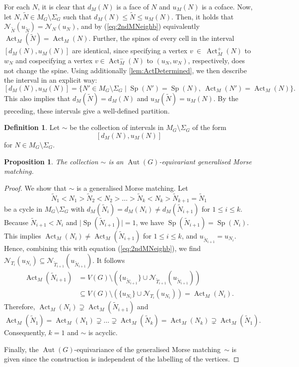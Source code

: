 \documentclass[reqno,dvipsnames]{amsart}
\theoremstyle{plain}
\newtheorem{proposition}[theorem]{Proposition}
\numberwithin{equation}{section}
\theoremstyle{definition}
\newtheorem{definition}[theorem]{Definition}
\DeclareMathOperator{\Act}{Act}
\DeclareMathOperator{\Sp}{Sp}
\DeclareMathOperator{\Aut}{Aut}
\begin{document}
For each $N$, it is clear that $d_M(N)$ is a face of $N$ and $u_M(N)$ is a coface. Now, let $N,\tilde{N}\in M_G\setminus \Sigma_G$ such that $d_M(N)\leq\tilde{N}\leq u_M(N)$. Then, it holds that $\mathcal{N}_{\tilde{N}}(u_{\tilde{N}})=\mathcal{N}_N(u_N)$, and by (\ref{eq:2ndMNeighb}) equivalently $\Act_M(\tilde{N})=\Act_M(N)$.
Further, the spines of every cell in the interval $[d_M(N),u_M(N)]$ are identical, since specifying a vertex $v~\in~\Act_M^+(N)$ to $w_N$ and cospecifying a vertex $v\in \Act_M^-(N)$ to $(u_N,w_N)$, respectively, does not change the spine. Using additionally \autoref{lem:ActDetermined}, we then describe the interval in an explicit way:
\[
[d_M(N), u_M(N)] = \{N'\in M_G\setminus \Sigma_G \mid \Sp(N') = \Sp(N), \> \Act_M(N') = \Act_M(N) \}.
\]
This also implies that $d_M(\tilde{N}) = d_M(N)$ and $u_M(\tilde{N}) = u_M(N)$. By the preceding, these intervals give a well-defined partition.

\begin{definition}
	Let $\sim$ be the collection of intervals in $M_G\setminus \Sigma_G$ of the form
	\[
	[d_M(N),u_M(N)]
	\]
	for $N\in M_G\setminus \Sigma_G$.
\end{definition}


\begin{proposition} \label{prop:EquivariantMatchingII}
	The collection $\sim$ is an $\Aut(G)$-equivariant generalised Morse matching.
\end{proposition}

\begin{proof}
	We show that $\sim$ is a generalised Morse matching. Let
	\[
	\tilde{N}_1 < N_1 > \tilde{N}_2 < N_2 > \ldots > \tilde{N}_k < N_k > \tilde{N}_{k+1} = \tilde{N}_1
	\]
	be a cycle in $M_G\setminus \Sigma_G$ with $d_M(\tilde{N}_i) = d_M(N_i) \neq d_M(\tilde{N}_{i+1})$ for $1\leq i \leq k$. Because $\tilde{N}_{i+1} < N_i$ and $\vert\Sp(\tilde{N}_{i+1})\vert =1$, we have $\Sp(\tilde{N}_{i+1}) = \Sp(N_i)$. This implies $\Act_M(N_i) \neq \Act_M(\tilde{N}_{i+1})$ for $1\leq i \leq k$, and $u_{\tilde{N}_{i+1}} = u_{N_i}$. Hence, combining this with equation (\ref{eq:2ndMNeighb}), we find $\mathcal{N}_{T_i}(u_{N_i}) \subseteq \mathcal{N}_{\tilde{T}_{i+1}}(u_{\tilde{N}_{i+1}})$. It follows
	\begin{align*}
		\Act_M (\tilde{N}_{i+1}) &= V(G)\setminus (\{u_{\tilde{N}_{i+1}}\} \cup \mathcal{N}_{\tilde{T}_{i+1}}(u_{\tilde{N}_{i+1}}) ) \\
		&\subseteq V(G)\setminus (\{u_{N_i}\} \cup \mathcal{N}_{T_i}(u_{N_i})) = \Act_M (N_i).
	\end{align*}
	Therefore, $\Act_M(N_i) \supsetneq \Act_M(\tilde{N}_{i+1})$ and 
	\[
	\Act_M(\tilde{N}_1) = \Act_M(N_1) \supsetneq \ldots \supsetneq \Act_M(\tilde{N}_k) = \Act_M(N_k) \supsetneq \Act_M(\tilde{N}_1).
	\]
	Consequently, $k=1$ and $\sim$ is acyclic.
	
	Finally, the $\Aut(G)$-equivariance of the generalised Morse matching~$\sim$ is given since the construction is independent of the labelling of the vertices.
\end{proof}
\end{document}
